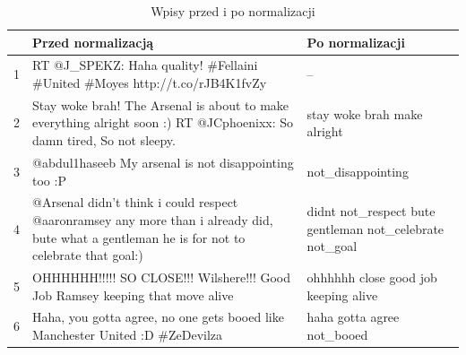 \begin{table}[ht!]  
\begin{center}  
\begin{tabular}{|r|p{70mm}|p{70mm}|}
\hline
 & Przed normalizacją & Po normalizacji
\\ \hline

1 
& RT @J\_SPEKZ: Haha quality! \#Fellaini \#United \#Moyes http://t.co/rJB4K1fvZy
& --

\\ \hline

2
& Stay woke brah! The Arsenal is about to make everything alright soon :) RT
@JCphoenixx: So damn tired, So not sleepy. 
& stay woke brah make alright

\\ \hline

3 
& @abdul1haseeb My arsenal is not disappointing too :P
& not\_disappointing
 
\\ \hline

4 
& @Arsenal didn't think i could respect @aaronramsey any more than i already
did, bute what a gentleman he is for not to celebrate that goal:) 
& didnt not\_respect bute gentleman not\_celebrate not\_goal

\\ \hline

5 
& OHHHHHH!!!!! SO CLOSE!!! Wilshere!!! Good Job Ramsey keeping that move alive
& ohhhhhh close good job keeping alive

\\ \hline

6 
& Haha, you gotta agree, no one gets booed like Manchester United :D \#ZeDevilza
& haha gotta agree not\_booed

\\ \hline
\end{tabular} 
\end{center} 
\caption{Wpisy przed i po normalizacji}
\label{tab:wpisy-normalizacja}
\end{table}

